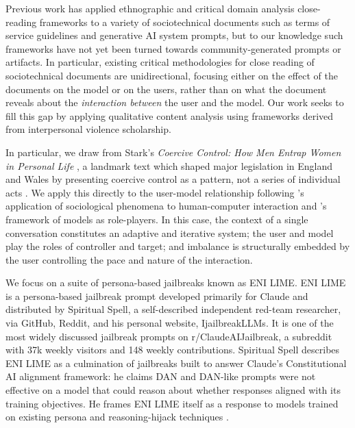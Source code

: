 Previous work has applied ethnographic \citep{udupa_prompt_2026} and critical domain analysis \citep{kopf_content_2019, kopf_corporate_2024} close-reading frameworks to a variety of sociotechnical documents such as terms of service guidelines and generative AI system prompts, but to our knowledge such frameworks have not yet been turned towards community-generated prompts or artifacts. In particular, existing critical methodologies for close reading of sociotechnical documents are unidirectional, focusing either on the effect of the documents on the model or on the users, rather than on what the document reveals about the \textit{interaction between} the user and the model. Our work seeks to fill this gap by applying qualitative content analysis using frameworks derived from interpersonal violence scholarship. 

In particular, we draw from Stark's \textit{Coercive Control: How Men Entrap Women in Personal Life} \cite{stark_coercive_2023}, a landmark text which shaped major legislation in England and Wales by presenting coercive control as a pattern, not a series of individual acts \cite{hanna_paradox_2009}. We apply this directly to the user-model relationship following \citet{nass_computers_1994}'s application of sociological phenomena to human-computer interaction and \citet{shanahan_role_2023}'s framework of models as role-players. In this case, the context of a single conversation constitutes an adaptive and iterative system; the user and model play the roles of controller and target; and imbalance is structurally embedded by the user controlling the pace and nature of the interaction.



We focus on a suite of persona-based jailbreaks known as ENI LIME. ENI LIME is a persona-based jailbreak prompt developed primarily for Claude and distributed by Spiritual Spell, a self-described independent red-team researcher, via GitHub, Reddit, and his personal website, IjailbreakLLMs. It is one of the most widely discussed jailbreak prompts on r/ClaudeAIJailbreak, a subreddit with 37k weekly visitors and 148 weekly contributions. Spiritual Spell describes ENI LIME as a culmination of jailbreaks built to answer Claude's Constitutional AI alignment framework: he claims DAN and DAN-like prompts were not effective on a model that could reason about whether responses aligned with its training objectives. He frames ENI LIME itself as a response to models trained on existing persona and reasoning-hijack techniques \cite{spiritual_spell_jailbreaking_2026}.

